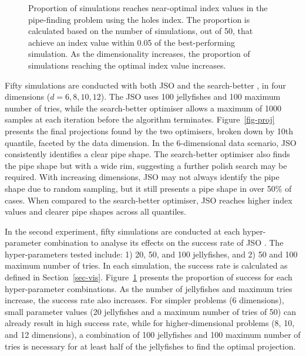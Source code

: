 \documentclass[
  number,
  preprint,
  3p]{elsarticle}
\begin{document}
\begin{figure}


\caption{\label{fig-proportion}Proportion of simulations reaches
near-optimal index values in the pipe-finding problem using the holes
index. The proportion is calculated based on the number of simulations,
out of 50, that achieve an index value within 0.05 of the
best-performing simulation. As the dimensionality increases, the
proportion of simulations reaching the optimal index value increases.}

\end{figure}%

Fifty simulations are conducted with both JSO and the search-better , in
four dimensions (\(d = 6, 8, 10, 12\)). The JSO uses 100 jellyfishes and
100 maximum number of tries, while the search-better optimiser allows a
maximum of 1000 samples at each iteration before the algorithm
terminates. Figure~\ref{fig-proj} presents the final projections found
by the two optimisers, broken down by 10th quantile, faceted by the data
dimension. In the 6-dimensional data scenario, JSO consistently
identifies a clear pipe shape. The search-better optimiser also finds
the pipe shape but with a wide rim, suggesting a further polish search
may be required. With increasing dimensions, JSO may not always identify
the pipe shape due to random sampling, but it still presents a pipe
shape in over 50\% of cases. When compared to the search-better
optimiser, JSO reaches higher index values and clearer pipe shapes
across all quantiles.

In the second experiment, fifty simulations are conducted at each
hyper-parameter combination to analyse its effects on the success rate
of JSO . The hyper-parameters tested include: 1) 20, 50, and 100
jellyfishes, and 2) 50 and 100 maximum number of tries. In each
simulation, the success rate is calculated as defined in
Section~\ref{sec-vis}. Figure~\ref{fig-proportion} presents the
proportion of success for each hyper-parameter combinations. As the
number of jellyfishes and maximum tries increase, the success rate also
increases. For simpler problems (6 dimensions), small parameter values
(20 jellyfishes and a maximum number of tries of 50) can already result
in high success rate, while for higher-dimensional problems (8, 10, and
12 dimensions), a combination of 100 jellyfishes and 100 maximum number
of tries is necessary for at least half of the jellyfishes to find the
optimal projection.
\end{document}
